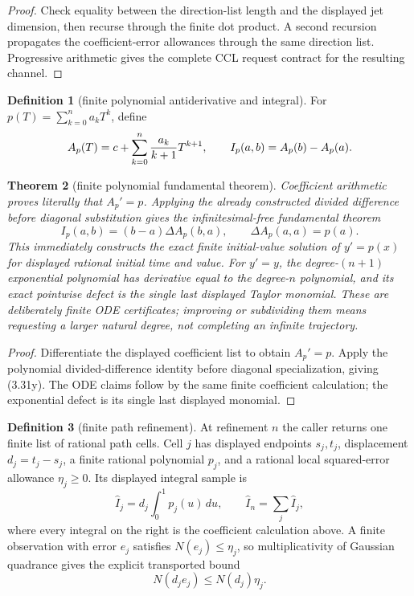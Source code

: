 \documentclass[10pt]{article}
\newtheorem{theorem}{Theorem}[section]
\theoremstyle{definition}
\newtheorem{definition}[theorem]{Definition}
\theoremstyle{remark}
\begin{document}
\begin{proof}
Check equality between the direction-list length and the displayed jet
dimension, then recurse through the finite dot product.  A second recursion
propagates the coefficient-error allowances through the same direction list.
Progressive arithmetic gives the complete CCL request contract for the
resulting channel.
\end{proof}

\begin{definition}[finite polynomial antiderivative and integral]
For $p(T)=\sum_{k=0}^n a_kT^k$, define
\[
 A_p(T)=c+\sum_{k=0}^n {a_k\over k+1}T^{k+1},\qquad
 I_p(a,b)=A_p(b)-A_p(a).
\]
\end{definition}

\begin{theorem}[finite polynomial fundamental theorem]
Coefficient arithmetic proves literally that $A_p'=p$.  Applying the already
constructed divided difference before diagonal substitution gives the
infinitesimal-free fundamental theorem
\[
 I_p(a,b)=(b-a)\Delta A_p(b,a),\qquad
 \Delta A_p(a,a)=p(a).
 \tag{3.31y}
\]
This immediately constructs the exact finite initial-value solution of
$y'=p(x)$ for displayed rational initial time and value.  For $y'=y$, the
degree-$(n+1)$ exponential polynomial has derivative equal to the degree-$n$
polynomial, and its exact pointwise defect is the single last displayed
Taylor monomial.  These are deliberately finite ODE certificates; improving
or subdividing them means requesting a larger natural degree, not completing
an infinite trajectory.
\end{theorem}

\begin{proof}
Differentiate the displayed coefficient list to obtain $A_p'=p$.  Apply the
polynomial divided-difference identity before diagonal specialization,
giving (3.31y).  The ODE claims follow by the same finite coefficient
calculation; the exponential defect is its single last displayed monomial.
\end{proof}

\begin{definition}[finite path refinement]
At refinement $n$ the caller
returns one finite list of rational path cells.  Cell $j$ has displayed
endpoints $s_j,t_j$, displacement $d_j=t_j-s_j$, a finite rational
polynomial $p_j$, and a rational local squared-error allowance
$\eta_j\geq0$.  Its displayed integral sample is
\[
 \widehat I_j=d_j\int_0^1p_j(u)\,du,
 \qquad
 \widehat I_n=\sum_j\widehat I_j,
 \tag{3.31y'}
\]
where every integral on the right is the coefficient calculation above.  A
finite observation with error $e_j$ satisfies
$N(e_j)\leq\eta_j$, so multiplicativity of Gaussian quadrance gives the
explicit transported bound
\[
 N(d_je_j)\leq N(d_j)\eta_j.
 \tag{3.31y''}
\]
\end{definition}
\end{document}
